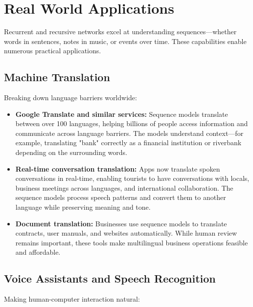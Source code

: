 
\section{Real World Applications}
\label{sec:sequence-real-world}


Recurrent and recursive networks excel at understanding sequences—whether words in sentences, notes in music, or events over time. These capabilities enable numerous practical applications.

\subsection{Machine Translation}

Breaking down language barriers worldwide:

\begin{itemize}
    \item \textbf{Google Translate and similar services:} Sequence models translate between over 100 languages, helping billions of people access information and communicate across language barriers. The models understand context—for example, translating "bank" correctly as a financial institution or riverbank depending on the surrounding words.
    
    \item \textbf{Real-time conversation translation:} Apps now translate spoken conversations in real-time, enabling tourists to have conversations with locals, business meetings across languages, and international collaboration. The sequence models process speech patterns and convert them to another language while preserving meaning and tone.
    
    \item \textbf{Document translation:} Businesses use sequence models to translate contracts, user manuals, and websites automatically. While human review remains important, these tools make multilingual business operations feasible and affordable.
\end{itemize}

\subsection{Voice Assistants and Speech Recognition}

Making human-computer interaction natural:

